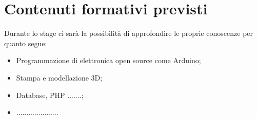 \section*{Contenuti formativi previsti}
Durante lo stage ci sarà la possibilità di approfondire le proprie conoscenze per quanto segue:
\begin{itemize}
	\item Programmazione di elettronica open source come Arduino;
	\item Stampa e modellazione 3D;
	\item Database, PHP .......;
	\item .....................
\end{itemize}
